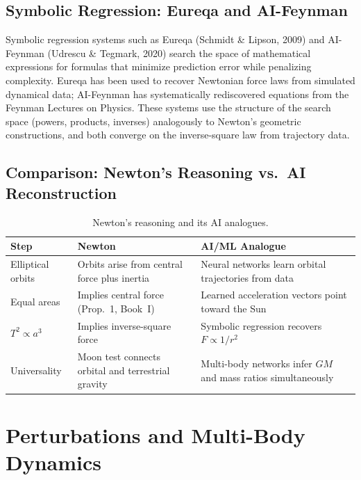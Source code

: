\documentclass[12pt]{article}
\begin{document}
\subsection{Symbolic Regression: Eureqa and AI-Feynman}

Symbolic regression systems such as Eureqa (Schmidt \& Lipson, 2009) and
AI-Feynman (Udrescu \& Tegmark, 2020) search the space of mathematical
expressions for formulas that minimize prediction error while penalizing
complexity.
Eureqa has been used to recover Newtonian force laws from simulated
dynamical data; AI-Feynman has systematically rediscovered equations from
the Feynman Lectures on Physics.
These systems use the structure of the search space (powers, products,
inverses) analogously to Newton's geometric constructions, and both converge
on the inverse-square law from trajectory data.

\subsection{Comparison: Newton's Reasoning vs.\ AI Reconstruction}

\begin{table}[h]
\centering
\renewcommand{\arraystretch}{1.3}
\begin{tabular}{p{3.5cm} p{4.5cm} p{4.5cm}}
\toprule
\textbf{Step} & \textbf{Newton} & \textbf{AI/ML Analogue} \\
\midrule
Elliptical orbits
  & Orbits arise from central force plus inertia
  & Neural networks learn orbital trajectories from data \\
Equal areas
  & Implies central force (Prop.\ 1, Book~I)
  & Learned acceleration vectors point toward the Sun \\
$T^{2} \propto a^{3}$
  & Implies inverse-square force
  & Symbolic regression recovers $F \propto 1/r^{2}$ \\
Universality
  & Moon test connects orbital and terrestrial gravity
  & Multi-body networks infer $GM$ and mass ratios simultaneously \\
\bottomrule
\end{tabular}
\caption{Newton's reasoning and its AI analogues.}
\end{table}

\section{Perturbations and Multi-Body Dynamics}
\end{document}

